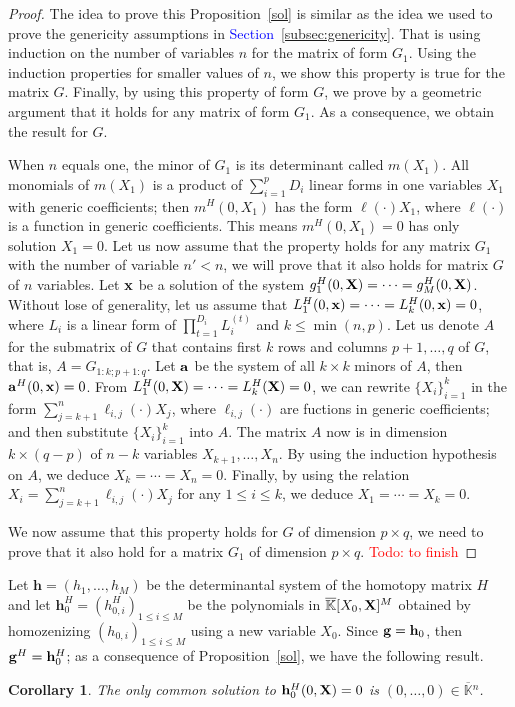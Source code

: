\documentclass[11pt]{article}
\numberwithin{Property}{section}
\numberwithin{Theorem}{section}
\numberwithin{Proposition}{section}
\numberwithin{Lemma}{section}
\newtheorem{Corollary}{Corollary}%
\numberwithin{Corollary}{section}
\numberwithin{Definition}{section}
\numberwithin{Remark}{section}
\numberwithin{Conjecture}{section}
\numberwithin{Problem}{section}
\numberwithin{Claim}{section}
\theoremstyle{definition}
\numberwithin{Example}{section}
\def\h {\ensuremath{\mathbf{h}}}
\renewcommand{\leq}{\leqslant}
\def\bar{\overline}
\newcommand{\field}{\mathbb{K}} %
\newcommand{\mat}[1]{\mathbf{\MakeUppercase{#1}}} %
\newcommand{\todo}[1]{\textcolor{red}{#1}} %
\newcommand{\improve}[1]{\textcolor{blue}{#1}} %
\begin{document}
\begin{proof}
The idea to prove this Proposition~\ref{sol} is similar as the idea we used to prove the genericity assumptions in \improve{Section~\ref{subsec:genericity}}. That is using induction on the number of variables $n$ for the matrix of form $G_1$. Using the induction properties for smaller values of $n$, we show this property is true for the matrix $G$. Finally, by using this property of form $G$, we prove by a geometric argument that it holds for any matrix of form $G_1$. As a consequence, we obtain the result for $G$. 

When $n$ equals one, the minor of $G_1$ is its determinant called $m(X_1)$. All monomials of $m(X_1)$ is a product of $\sum_{i=1}^pD_i$ linear forms in one variables $X_1$ with generic coefficients; then $m^H(0,X_1)$ has the form $\ell(\boldsymbol{\cdot})X_1$, where $\ell(\boldsymbol{\cdot})$ is a function in generic coefficients. This means $m^H(0,X_1) = 0$ has only solution $X_1 = 0$. Let us now assume that the property holds for any matrix $G_1$ with the number of variable $n' < n$, we will prove that it also holds for matrix $G$ of $n$ variables. Let ${\bf x}$ be a solution of the system $g_1^H(0,\mat{X}) = \cdots = g_M^H(0,\mat{X})$. Without lose of generality, let us assume that $L_1^H(0,{\bf x}) = \cdots = L_k^H(0,{\bf x}) = 0$, where $L_i$ is a linear form of $\prod_{t=1}^{D_i}L_i^{(t)}$ and $k \leq \min(n,p)$. Let us denote $A$ for the submatrix of $G$ that contains first $k$ rows and columns $p+1, \ldots, q$ of $G$, that is, $A = G_{1:k;p+1:q}$. Let ${\bf a}$ be the system of all $k \times k$ minors of $A$, then ${\bf a}^H(0,{\bf x}) = 0$. From $L_1^H(0,{\bf X}) = \cdots = L_k^H({\bf X}) = 0$, we can rewrite $\{X_i\}_{i=1}^k$ in the form $\sum_{j = k+1}^n \ell_{i,j}(\boldsymbol{\cdot})X_j$, 
where $\ell_{i,j}(\boldsymbol{\cdot})$ are fuctions in generic coefficients; and then substitute $\{X_i\}_{i=1}^k$ into $A$. The matrix $A$ now is in dimension $k \times (q-p)$ of $n-k$ variables $X_{k+1}, \ldots, X_n$. By using the induction hypothesis on $A$, we deduce $X_{k} = \cdots = X_{n} = 0$. Finally, by using the relation $ X_i = \sum_{j = k+1}^n \ell_{i,j}(\boldsymbol{\cdot})X_j$ for any $1 \leq i \leq k$, we deduce $X_1 = \cdots = X_k = 0$. 

We now assume that this property holds for $G$ of dimension $p \times q$, we need to prove that it also hold for a matrix $G_1$ of dimension $p \times q$. 
\todo{Todo: to finish}
\end{proof}
Let $\h = (h_1, \ldots, h_M)$ be the determinantal system of the homotopy matrix $H$ and let $\h_{0}^H = (h_{0,i}^H)_{1 \leq i \leq M}$ be the polynomials in $\bar{\field}[X_0, \mat{X}]^M$ obtained by homozenizing $(h_{0,i})_{1 \leq i \leq M}$ using a new variable $X_0$. Since ${\bf{g}} = {\bf{h}}_0$, then ${\bf{g}}^H = {\bf{h}}_0^H$; as a consequence of Proposition~\ref{sol}, we have the following result. 
\begin{Corollary}\label{valuation}
The only common solution to $\h_{0}^H(0,\mat{X})=0$ is $(0,\dots,0)\in \bar{\field}{}^n$. 
\end{Corollary}
\end{document}
